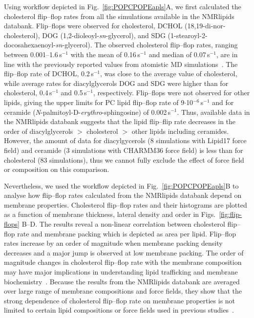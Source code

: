 \documentclass[fleqn,10pt]{wlscirep}
\begin{document}
Using workflow depicted in Fig.~\ref{fig:POPCPOPEapls}A, we first calculated the cholesterol flip--flop rates from all the simulations available in the NMRlipids databank. Flip--flops were observed for cholesterol, %
DCHOL (18,19-di-nor-cholesterol), %
DOG (1,2-dioleoyl-\textit{sn}-glycerol), %
and SDG (1-stearoyl-2-docosahexaenoyl-\textit{sn}-glycerol). The observed cholesterol flip--flop rates, ranging between 0.001--1.6\,\textmu{}s$^{-1}$ with the mean of 0.16\,\textmu{}s$^{-1}$ and median of 0.07\,\textmu{}s$^{-1}$, are in line with the previously reported values from atomistic MD simulations~\cite{gu19,javanainen19,baral20}. The flip--flop rate of DCHOL, 0.2\,\textmu{}s$^{-1}$, was close to the average value of cholesterol, while average rates for diacylglycerols DOG and SDG were higher than for cholesterol, 0.4\,\textmu{}s$^{-1}$ and 0.5\,\textmu{}s$^{-1}$, respectively. Flip--flops were not observed for other lipids, giving the upper limits for PC lipid flip--flop rate of 9$\cdot$10$^{-6}$\,\textmu{}s$^{-1}$ and for ceramide (\textit{N}-palmitoyl-\textsc{D}-\textit{erythro}-sphingosine) of 0.002\,\textmu{}s$^{-1}$. Thus, available data in the NMRlipids databank suggests that the lipid flip--flip rate decreases in the order of diacylglycerols $>$ cholesterol $>$ other lipids including ceramides. However, the amount of data for diacylgycerols (8 simulations with Lipid17 force field) and ceramide (3 simulations with CHARMM36 force field) is less than for cholesterol (83 simulations), thus we cannot fully exclude the effect of force field or composition on this comparison.

Nevertheless, we used the workflow depicted in Fig.~\ref{fig:POPCPOPEapls}B to analyse how flip--flop rates calculated from the NMRlipids databank depend on membrane properties. Cholesterol flip--flop rates and their histograms are plotted as a function of membrane thickness, lateral density and order in Figs.~\ref{fig:flip-flops} B--D. The results reveal a non-linear correlation between cholesterol flip--flop rate and membrane packing which is depicted as area per lipid. Flip--flop rates increase by an order of magnitude when membrane packing density decreases and a major jump is observed at low membrane packing. The order of magnitude changes in cholesterol flip--flop rate with the membrane composition may have major implications in understanding lipid trafficking and membrane biochemistry~\cite{gu19,baral20}. Because the results from the NMRlipids databank are averaged over large range of membrane compositions and force fields, they show that the strong dependence of cholesterol flip--flop rate on membrane properties is not limited to certain lipid compositions or force fields used in previous studies~\cite{gu19,javanainen19,baral20}.
\end{document}
